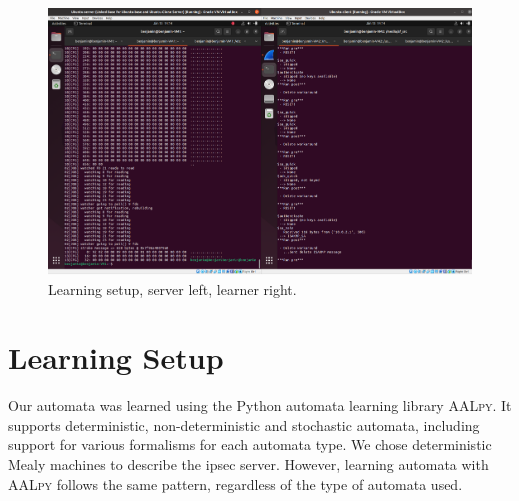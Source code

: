 \begin{figure}
	\centering
	\includegraphics[width=\linewidth]{images/VM_setup}
	\caption{Learning setup, server left, learner right.}
	\label{fig:vmsetup}
\end{figure}

\section{Learning Setup} \label{subsec:learningenv}%
Our automata was learned using the Python automata learning library \textsc{AALpy}. It supports deterministic, non-deterministic and stochastic automata, including support for various formalisms for each automata type. We chose deterministic Mealy machines to describe the \ac{ipsec} server. However, learning automata with \textsc{AALpy} follows the same pattern, regardless of the type of automata used.

